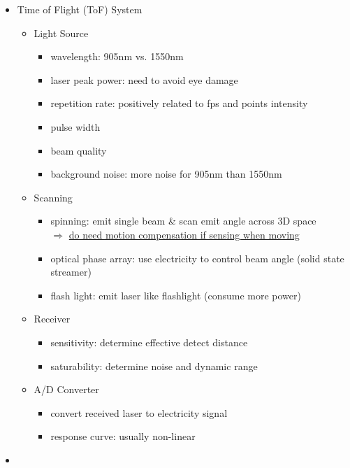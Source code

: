 \begin{itemize}
\item Time of Flight (ToF) System
	\begin{itemize}
	\item Light Source
		\begin{itemize}
		\item wavelength: 905nm vs. 1550nm
		\item laser peak power: need to avoid eye damage
		\item repetition rate: positively related to fps and points intensity
		\item pulse width
		\item beam quality
		\item background noise: more noise for 905nm than 1550nm
		\end{itemize}
	\item Scanning
		\begin{itemize}
		\item spinning: emit single beam \& scan emit angle across 3D space \\
		$\Rightarrow$ \underline{do need motion compensation if sensing when moving}
		\item optical phase array: use electricity to control beam angle (solid state streamer)
		\item flash light: emit laser like flashlight (consume more power)
		\end{itemize}
	\item Receiver
		\begin{itemize}
		\item sensitivity: determine effective detect distance
		\item saturability: determine noise and dynamic range
		\end{itemize}
	\item A/D Converter
		\begin{itemize}
		\item convert received laser to electricity signal
		\item response curve: usually non-linear
		\end{itemize}
	\end{itemize}
\item 
\end{itemize}

